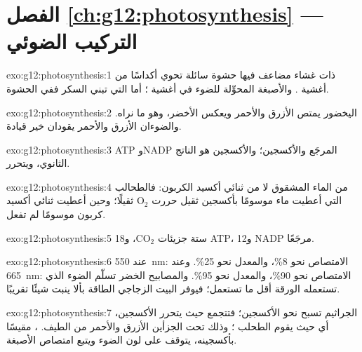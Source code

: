 \section*{الفصل \ref{ch:g12:photosynthesis} --- التركيب الضوئي}

\begin{solution}{exo:g12:photosynthesis:1}
 ذات غشاء مضاعف فيها حشوة سائلة تحوي أكداسًا من أغشية .
والأصبغة  المحوِّلة للضوء في أغشية ؛ أما 
التي تبني السكر ففي الحشوة.
\end{solution}

\begin{solution}{exo:g12:photosynthesis:2}
اليخضور يمتص الأزرق والأحمر ويعكس الأخضر، وهو ما نراه. والضوءان
الأزرق والأحمر يقودان  خير قيادة.
\end{solution}

\begin{solution}{exo:g12:photosynthesis:3}
ATP وNADP المرجَع والأكسجين؛ والأكسجين هو الناتج الثانوي، ويتحرر.
\end{solution}

\begin{solution}{exo:g12:photosynthesis:4}
من الماء المشقوق لا من ثنائي أكسيد الكربون: فالطحالب التي أعطيت ماء
موسومًا بأكسجين ثقيل حررت $\mathrm{O_2}$ ثقيلًا؛ وحين أعطيت ثنائي
أكسيد كربون موسومًا لم تفعل.
\end{solution}

\begin{solution}{exo:g12:photosynthesis:5}
ستة جزيئات $\mathrm{CO_2}$، و18 ATP، و12 NADP مرجَعًا.
\end{solution}

\begin{solution}{exo:g12:photosynthesis:6}
عند \qty{550}{nm}: الامتصاص نحو 8\%، والمعدل نحو 25\%. وعند
\qty{665}{nm}: الامتصاص نحو 90\%، والمعدل نحو 95\%. والمصابيح الخضر
تسلّم الضوء الذي تستعمله الورقة أقل ما تستعمل؛ فيوفر البيت الزجاجي
الطاقة بألا ينبت شيئًا تقريبًا.
\end{solution}

\begin{solution}{exo:g12:photosynthesis:7}
الجراثيم تسبح نحو الأكسجين؛ فتتجمع حيث يتحرر الأكسجين، أي حيث يقوم
الطحلب ؛ وذلك تحت الجزأين الأزرق والأحمر من الطيف.
، مقيسًا بأكسجينه، يتوقف على لون الضوء ويتبع امتصاص
الأصبغة.
\end{solution}

